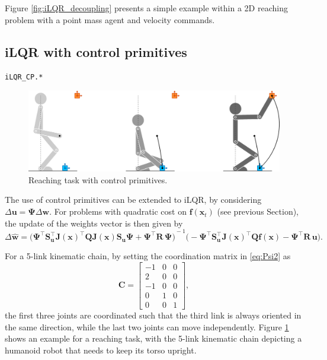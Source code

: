 \documentclass[10pt,a4paper]{article} %
\newcommand{\trsp}{{\scriptscriptstyle\top}}
\newcommand{\filename}[1]{\colorbox{rr2}{\color{white}\texttt{#1}}}
\begin{document}
Figure \ref{fig:iLQR_decoupling} presents a simple example within a 2D reaching problem with a point mass agent and velocity commands.

\newpage

\subsection{iLQR with control primitives}
\begin{flushright}
\filename{iLQR\_CP.*}
\end{flushright}

\begin{figure}
\centering
\includegraphics[width=.6\columnwidth]{images/iLQR_humanoid_CP01.png}
\caption{\footnotesize
Reaching task with control primitives.
}
\label{fig:iLQR_humanoid}
\end{figure}

The use of control primitives can be extended to iLQR, by considering $\Delta\bm{u}=\bm{\Psi}\Delta\bm{w}$. 
For problems with quadratic cost on $\bm{f}(\bm{x}_t)$ (see previous Section), the update of the weights vector is then given by
\begin{equation}
	\Delta\bm{\hat{w}} \!=\! {\Big( \bm{\Psi}^{\!\trsp}\bm{S}_{\bm{u}}^\trsp \bm{J}(\bm{x})^\trsp \bm{Q} \bm{J}(\bm{x}) \bm{S}_{\bm{u}} \bm{\Psi} 
	+ \bm{\Psi}^{\!\trsp} \bm{R}\, \bm{\Psi} \Big)}^{\!\!-1} 
	\Big(- \bm{\Psi}^{\!\trsp} \bm{S}_{\bm{u}}^\trsp \bm{J}(\bm{x})^\trsp \bm{Q} \bm{f}(\bm{x}) - \bm{\Psi}^{\!\trsp} \bm{R} \, \bm{u} \Big).
	\label{eq:dw}
\end{equation}

For a 5-link kinematic chain, by setting the coordination matrix in \eqref{eq:Psi2} as
\begin{equation*}
	\bm{C} = \begin{bmatrix}-1 & 0 & 0 \\ 2 & 0 & 0 \\ -1 & 0 & 0 \\ 0 & 1 & 0 \\ 0 & 0 & 1\end{bmatrix},
\end{equation*}
the first three joints are coordinated such that the third link is always oriented in the same direction, while the last two joints can move independently. Figure \ref{fig:iLQR_humanoid} shows an example for a reaching task, with the 5-link kinematic chain depicting a humanoid robot that needs to keep its torso upright.
\end{document}
